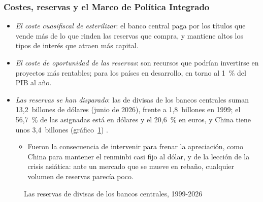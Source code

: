 \documentclass[11pt]{article}
\begin{document}
\subsubsection{Costes, reservas y el Marco de Política Integrado}\label{sec:intervencion-costes}

\begin{itemize}
\item \emph{El coste cuasifiscal de esterilizar}: el banco central paga por los títulos que vende más de lo que rinden las reservas que compra, y mantiene altos los tipos de interés que atraen más capital\nocite{Calvo1991Esterilizacion}.
\item \emph{El coste de oportunidad de las reservas}: son recursos que podrían invertirse en proyectos más rentables; para los países en desarrollo, en torno al 1~\% del PIB al año\nocite{Rodrik2006Social}.
\item \emph{Las reservas se han disparado}: las de divisas de los bancos centrales suman 13,2~billones de dólares (junio de 2026), frente a 1,8~billones en 1999; el 56,7~\% de las asignadas está en dólares y el 20,6~\% en euros\nocite{FMI2026COFER}, y China tiene unos 3,4~billones\nocite{SAFE2026Reservas} (gráfico~\ref{fig:reservas-mundiales}) .
  \begin{itemize}
  \item Fueron la consecuencia de intervenir para frenar la apreciación, como China para mantener el renminbi casi fijo al dólar, y de la lección de la crisis asiática: ante un mercado que se mueve en rebaño, cualquier volumen de reservas parecía poco.
  \end{itemize}
\end{itemize}

\begin{figure}[H]
\centering
\caption{Las reservas de divisas de los bancos centrales, 1999-2026}\label{fig:reservas-mundiales}
\end{figure}
\end{document}
